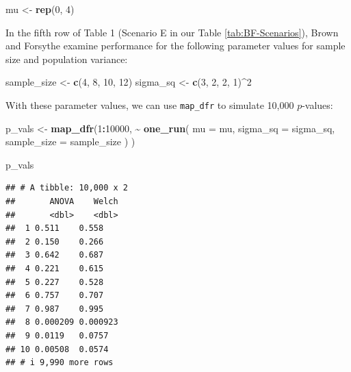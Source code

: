 \documentclass[
]{book}
\newenvironment{Shaded}{\begin{snugshade}}{\end{snugshade}}
\newcommand{\AttributeTok}[1]{\textcolor[rgb]{0.13,0.29,0.53}{#1}}
\newcommand{\DecValTok}[1]{\textcolor[rgb]{0.00,0.00,0.81}{#1}}
\newcommand{\FunctionTok}[1]{\textcolor[rgb]{0.13,0.29,0.53}{\textbf{#1}}}
\newcommand{\NormalTok}[1]{#1}
\newcommand{\OtherTok}[1]{\textcolor[rgb]{0.56,0.35,0.01}{#1}}
\newcommand{\SpecialCharTok}[1]{\textcolor[rgb]{0.81,0.36,0.00}{\textbf{#1}}}
\begin{document}
\begin{Shaded}
\begin{Highlighting}[]
\NormalTok{mu }\OtherTok{\textless{}{-}} \FunctionTok{rep}\NormalTok{(}\DecValTok{0}\NormalTok{, }\DecValTok{4}\NormalTok{)}
\end{Highlighting}
\end{Shaded}

In the fifth row of Table 1 (Scenario E in our Table \ref{tab:BF-Scenarios}), Brown and Forsythe examine performance for the following parameter values for sample size and population variance:

\begin{Shaded}
\begin{Highlighting}[]
\NormalTok{sample\_size }\OtherTok{\textless{}{-}} \FunctionTok{c}\NormalTok{(}\DecValTok{4}\NormalTok{, }\DecValTok{8}\NormalTok{, }\DecValTok{10}\NormalTok{, }\DecValTok{12}\NormalTok{)}
\NormalTok{sigma\_sq }\OtherTok{\textless{}{-}} \FunctionTok{c}\NormalTok{(}\DecValTok{3}\NormalTok{, }\DecValTok{2}\NormalTok{, }\DecValTok{2}\NormalTok{, }\DecValTok{1}\NormalTok{)}\SpecialCharTok{\^{}}\DecValTok{2}
\end{Highlighting}
\end{Shaded}

With these parameter values, we can use \texttt{map\_dfr} to simulate 10,000 \(p\)-values:

\begin{Shaded}
\begin{Highlighting}[]
\NormalTok{p\_vals }\OtherTok{\textless{}{-}} \FunctionTok{map\_dfr}\NormalTok{(}\DecValTok{1}\SpecialCharTok{:}\DecValTok{10000}\NormalTok{, }
  \SpecialCharTok{\textasciitilde{}} \FunctionTok{one\_run}\NormalTok{(}
      \AttributeTok{mu =}\NormalTok{ mu,}
      \AttributeTok{sigma\_sq =}\NormalTok{ sigma\_sq,}
      \AttributeTok{sample\_size =}\NormalTok{ sample\_size}
\NormalTok{    ) }
\NormalTok{)}

\NormalTok{p\_vals}
\end{Highlighting}
\end{Shaded}

\begin{verbatim}
## # A tibble: 10,000 x 2
##       ANOVA    Welch
##       <dbl>    <dbl>
##  1 0.511    0.558   
##  2 0.150    0.266   
##  3 0.642    0.687   
##  4 0.221    0.615   
##  5 0.227    0.528   
##  6 0.757    0.707   
##  7 0.987    0.995   
##  8 0.000209 0.000923
##  9 0.0119   0.0757  
## 10 0.00508  0.0574  
## # i 9,990 more rows
\end{verbatim}
\end{document}
